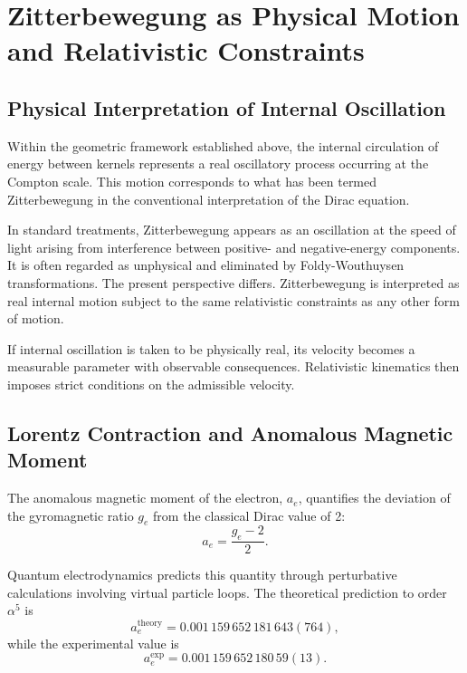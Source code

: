 \documentclass[%
 reprint,
 amsmath,amssymb,
 aps,
 prb,
]{revtex4-2}
\numberwithin{equation}{section}
\begin{document}
\section{Zitterbewegung as Physical Motion and Relativistic Constraints}
\label{sec:zitterbewegung}


\subsection{Physical Interpretation of Internal Oscillation}
\label{subsec:physical_interpretation}

Within the geometric framework established above, the internal circulation of energy between kernels represents a real oscillatory process occurring at the Compton scale. This motion corresponds to what has been termed Zitterbewegung in the conventional interpretation of the Dirac equation.

In standard treatments, Zitterbewegung appears as an oscillation at the speed of light arising from interference between positive- and negative-energy components. It is often regarded as unphysical and eliminated by Foldy-Wouthuysen transformations. The present perspective differs. Zitterbewegung is interpreted as real internal motion subject to the same relativistic constraints as any other form of motion.

If internal oscillation is taken to be physically real, its velocity becomes a measurable parameter with observable consequences. Relativistic kinematics then imposes strict conditions on the admissible velocity.


\subsection{Lorentz Contraction and Anomalous Magnetic Moment}
\label{subsec:lorentz_contraction}

The anomalous magnetic moment of the electron, $a_e$, quantifies the deviation of the gyromagnetic ratio $g_e$ from the classical Dirac value of 2:
\begin{equation}
a_e = \frac{g_e - 2}{2}.
\label{eq:anomalous_moment_def}
\end{equation}

Quantum electrodynamics predicts this quantity through perturbative calculations involving virtual particle loops. The theoretical prediction to order $\alpha^5$ is~\cite{QED_Theory}
\begin{equation}
a_e^{\mathrm{theory}} = 0.001\,159\,652\,181\,643(764),
\label{eq:a_e_theory}
\end{equation}
while the experimental value is~\cite{Hanneke2008}
\begin{equation}
a_e^{\mathrm{exp}} = 0.001\,159\,652\,180\,59(13).
\label{eq:a_e_exp}
\end{equation}
\end{document}
